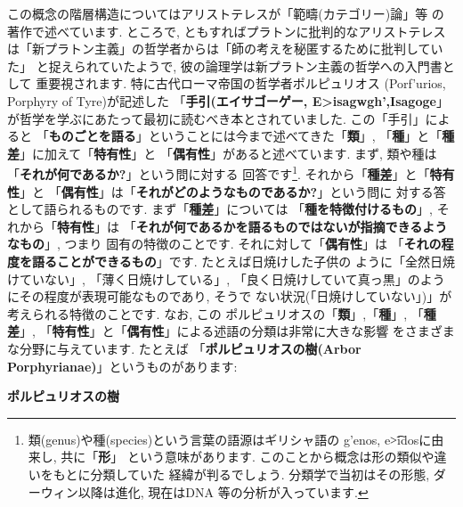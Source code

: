 \documentclass[b5j,8pt,twocolumn]{ltjsarticle}
\newcommand{\textgreek}[1]{\begingroup\fontencoding{LGR}\selectfont#1\endgroup}
\newcommand{\textgreek}[1]{\begingroup\fontencoding{LGR}\selectfont#1\endgroup}
\begin{document}
この概念の階層構造についてはアリストテレスが「範疇(カテゴリー)論」等
の著作で述べています. ところで, ともすればプラトンに批判的なアリストテレス
は「新プラトン主義」の哲学者からは「師の考えを秘匿するために批判していた」
と捉えられていたようで, 彼の論理学は新プラトン主義の哲学への入門書として
重要視されます. 特に古代ローマ帝国の哲学者ポルピュリオス
(\textgreek{Porf'urios}, Porphyry of Tyre)が記述した
「\textbf{手引(エイサゴーゲー, \textgreek{E>isagwgh'},Isagoge\cite{Barnes}}」
が哲学を学ぶにあたって最初に読むべき本とされていました. この「手引」によると
「\textbf{ものごとを語る}」ということには今まで述べてきた「\textbf{類}」,
 「\textbf{種}」と「\textbf{種差}」に加えて「\textbf{特有性}」と
「\textbf{偶有性}」があると述べています. まず, 類や種は「\textbf{それが何であるか?}」という問に対する
回答です\footnote{類(genus)や種(species)という言葉の語源はギリシャ語の
\textgreek{g'enos}, \textgreek{e\t{>i}dos}に由来し, 共に「\textbf{形}」
という意味があります. このことから概念は形の類似や違いをもとに分類していた
経緯が判るでしょう. 分類学で当初はその形態, ダーウィン以降は進化, 現在はDNA
等の分析が入っています.}. それから「\textbf{種差}」と「\textbf{特有性}」と
「\textbf{偶有性}」は「\textbf{それがどのようなものであるか?}」という問に
対する答として語られるものです. まず「\textbf{種差}」については
「\textbf{種を特徴付けるもの}」, それから「\textbf{特有性}」は
「\textbf{それが何であるかを語るものではないが指摘できるようなもの}」, つまり
固有の特徴のことです. それに対して「\textbf{偶有性}」は
「\textbf{それの程度を語ることができるもの}」です. たとえば日焼けした子供の
ように「全然日焼けていない」, 「薄く日焼けしている」, 
「良く日焼けしていて真っ黒」のようにその程度が表現可能なものであり, そうで
ない状況(「日焼けしていない」)」が考えられる特徴のことです. なお, この
ポルピュリオスの「\textbf{類}」,「\textbf{種}」, 「\textbf{種差}」,
「\textbf{特有性}」と「\textbf{偶有性}」による述語の分類は非常に大きな影響
をさまざまな分野に与えています. たとえば
「\textbf{ポルピュリオスの樹(Arbor Porphyrianae)}」というものがあります:


\begin{itembox}[c]{\textbf{ポルピュリオスの樹}}
{\tiny
{}
}
\end{itembox}
\end{document}
